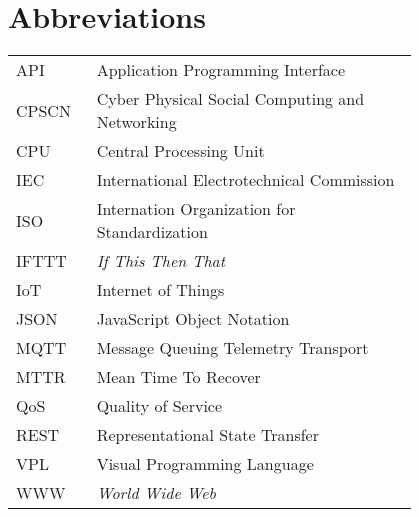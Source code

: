 \chapter*{Abbreviations}


\begin{flushleft}
\begin{tabular}{l p{0.8\linewidth}}
API      & Application Programming Interface\\
CPSCN    & Cyber Physical Social Computing and Networking\\
CPU      & Central Processing Unit\\
IEC      & International Electrotechnical Commission\\
ISO      & Internation Organization for Standardization\\
IFTTT    & \textit{If This Then That}\\
IoT      & Internet of Things\\
JSON     & JavaScript Object Notation\\
MQTT     & Message Queuing Telemetry Transport\\
MTTR     & Mean Time To Recover\\
QoS      & Quality of Service\\
REST     & Representational State Transfer\\
VPL      & Visual Programming Language\\
WWW      & \textit{World Wide Web}\\
\end{tabular}
\end{flushleft}

